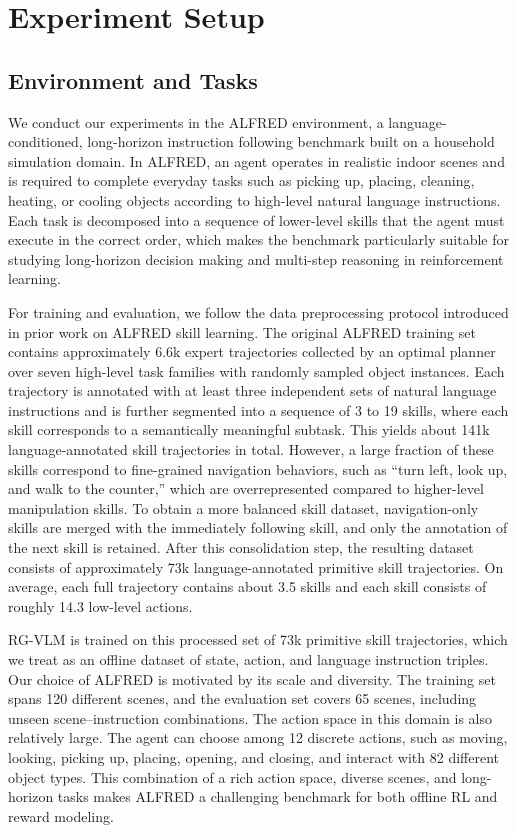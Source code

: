 \documentclass[master,english,final]{kaist-ucs}
\begin{document}
\section{Experiment Setup}
\subsection{Environment and Tasks}
We conduct our experiments in the ALFRED\cite{shridhar2020alfred} environment, a language-conditioned, long-horizon instruction following benchmark built on a household simulation domain. In ALFRED\cite{shridhar2020alfred}, an agent operates in realistic indoor scenes and is required to complete everyday tasks such as picking up, placing, cleaning, heating, or cooling objects according to high-level natural language instructions. Each task is decomposed into a sequence of lower-level skills that the agent must execute in the correct order, which makes the benchmark particularly suitable for studying long-horizon decision making and multi-step reasoning in reinforcement learning.

For training and evaluation, we follow the data preprocessing protocol introduced in prior work on ALFRED skill learning\cite{zhang2024sprint}. The original ALFRED\cite{shridhar2020alfred} training set contains approximately 6.6k expert trajectories collected by an optimal planner over seven high-level task families with randomly sampled object instances. Each trajectory is annotated with at least three independent sets of natural language instructions and is further segmented into a sequence of 3 to 19 skills, where each skill corresponds to a semantically meaningful subtask. This yields about 141k language-annotated skill trajectories in total. However, a large fraction of these skills correspond to fine-grained navigation behaviors, such as “turn left, look up, and walk to the counter,” which are overrepresented compared to higher-level manipulation skills. To obtain a more balanced skill dataset, navigation-only skills are merged with the immediately following skill, and only the annotation of the next skill is retained. After this consolidation step, the resulting dataset consists of approximately 73k language-annotated primitive skill trajectories. On average, each full trajectory contains about 3.5 skills and each skill consists of roughly 14.3 low-level actions.

RG-VLM is trained on this processed set of 73k primitive skill trajectories, which we treat as an offline dataset of state, action, and language instruction triples. Our choice of ALFRED is motivated by its scale and diversity. The training set spans 120 different scenes, and the evaluation set covers 65 scenes, including unseen scene–instruction combinations. The action space in this domain is also relatively large. The agent can choose among 12 discrete actions, such as moving, looking, picking up, placing, opening, and closing, and interact with 82 different object types. This combination of a rich action space, diverse scenes, and long-horizon tasks makes ALFRED a challenging benchmark for both offline RL and reward modeling.
\end{document}
